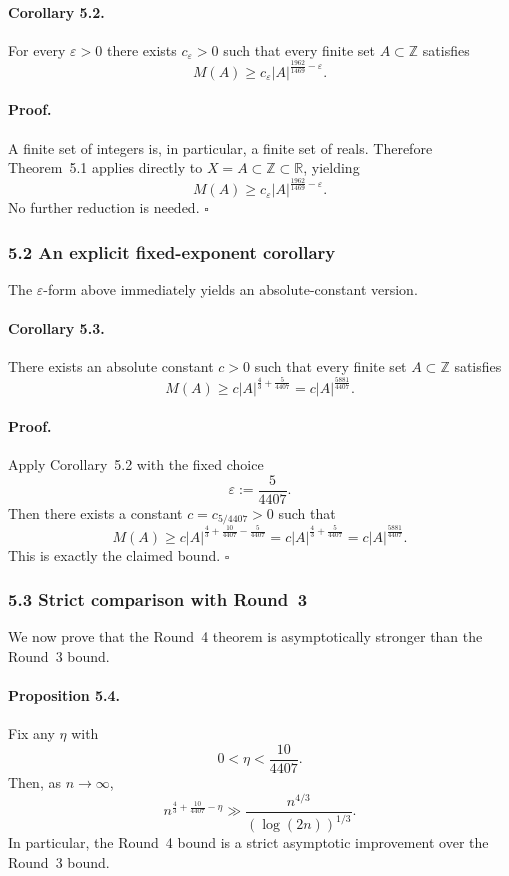 \paragraph{Corollary 5.2.}
For every $\varepsilon>0$ there exists $c_{\varepsilon}>0$ such that every finite set $A\subset\mathbb Z$ satisfies
\[
M(A)\ge c_{\varepsilon}|A|^{\frac{1962}{1469}-\varepsilon}.
\]

\paragraph{Proof.}
A finite set of integers is, in particular, a finite set of reals. Therefore Theorem~5.1 applies directly to $X=A\subset\mathbb Z\subset\mathbb R$, yielding
\[
M(A)\ge c_{\varepsilon}|A|^{\frac{1962}{1469}-\varepsilon}.
\]
No further reduction is needed.
\hfill $\square$

\subsubsection{5.2 An explicit fixed-exponent corollary}
The $\varepsilon$-form above immediately yields an absolute-constant version.

\paragraph{Corollary 5.3.}
There exists an absolute constant $c>0$ such that every finite set $A\subset\mathbb Z$ satisfies
\[
M(A)\ge c|A|^{\frac43+\frac{5}{4407}}=c|A|^{\frac{5881}{4407}}.
\]

\paragraph{Proof.}
Apply Corollary~5.2 with the fixed choice
\[
\varepsilon:=\frac{5}{4407}.
\]
Then there exists a constant $c=c_{5/4407}>0$ such that
\[
M(A)\ge c|A|^{\frac43+\frac{10}{4407}-\frac{5}{4407}}
=c|A|^{\frac43+\frac{5}{4407}}
=c|A|^{\frac{5881}{4407}}.
\]
This is exactly the claimed bound.
\hfill $\square$

\subsubsection{5.3 Strict comparison with Round~3}
We now prove that the Round~4 theorem is asymptotically stronger than the Round~3 bound.

\paragraph{Proposition 5.4.}
Fix any $\eta$ with
\[
0<\eta<\frac{10}{4407}.
\]
Then, as $n\to\infty$,
\[
n^{\frac43+\frac{10}{4407}-\eta}
\gg
\frac{n^{4/3}}{(\log(2n))^{1/3}}.
\]
In particular, the Round~4 bound is a strict asymptotic improvement over the Round~3 bound.

